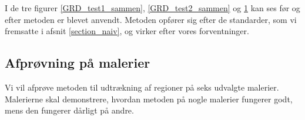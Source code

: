 \begin{figure}[!h]
    \centering
    	\hspace{1em}
		\hspace{1em}
        \caption[]{}
     \label{GRD_test3_sammen}
\end{figure}

I de tre figurer \ref{GRD_test1_sammen}, \ref{GRD_test2_sammen} og
\ref{GRD_test3_sammen} kan ses før og efter metoden er blevet anvendt.
Metoden opfører sig efter de standarder, som vi fremsatte i afsnit \ref{section_naiv}, og
virker efter vores forventninger.
\clearpage

\subsection{Afprøvning på malerier}
Vi vil afprøve metoden til udtrækning af regioner på seks udvalgte
malerier. Malerierne skal demonstrere, hvordan metoden på nogle malerier
fungerer godt, mens den fungerer dårligt på andre.

